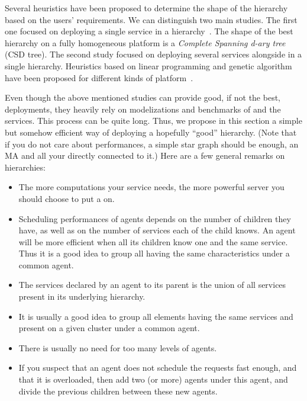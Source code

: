 Several heuristics have been proposed to determine the shape of the hierarchy
based on the users' requirements. We can distinguish two main studies. The
first one focused on deploying a single service in a \diet
hierarchy~\cite{InProceedingsCaron.CCD_08,InProceedingsCaron.CCL_04}. The shape
of the best hierarchy on a fully homogeneous platform is a \emph{Complete
Spanning d-ary tree} (CSD tree). The second study focused on deploying several
services alongside in a single hierarchy. Heuristics based on linear
programming and genetic algorithm have been proposed for different kinds of
platform~\cite{CARON:2010:INRIA-00490406:1,CARON:2010:INRIA-00456045:3}.

Even though the above mentioned studies can provide good, if not the best,
deployments, they heavily rely on modelizations and benchmarks of \diet and the
services. This process can be quite long. Thus, we propose in this section a
simple but somehow efficient way of deploying a hopefully ``good'' hierarchy.
(Note that if you do not care about performances, a simple star
graph should be enough, \ie an MA and all your \seds directly connected to it.)
Here are a few general remarks on \diet hierarchies:
\begin{itemize}
\item The more computations your service needs, the more powerful server you
  should choose to put a \sed on.
\item Scheduling performances of agents depends on the number of children they
  have, as well as on the number of services each of the child knows. An agent
  will be more efficient when all its children know one and the same
  service. Thus it is a good idea to group all \seds having the same
  characteristics under a common agent.
\item The services declared by an agent to its parent is the union of all
  services present in its underlying hierarchy.
\item It is usually a good idea to group all \diet elements having the same
  services and present on a given cluster under a common agent.
\item There is usually no need for too many levels of agents.
\item If you suspect that an agent does not schedule the requests fast enough,
  and that it is overloaded, then add two (or more) agents under this agent,
  and divide the previous children between these new agents.
\end{itemize}


